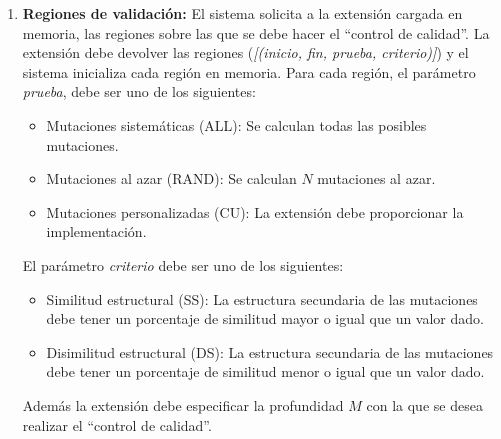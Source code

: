 \documentclass[10pt,a4paper]{article}
\begin{document}
\begin{enumerate}
    \item \textbf{Regiones de validaci\'on:}
    El sistema solicita a la extensi\'on cargada en memoria, las regiones sobre
las que se debe hacer el ``control de calidad''. La extensi\'on debe devolver
las regiones (\textit{[(inicio, fin, prueba, criterio)]}) y el sistema
inicializa cada regi\'on en memoria. Para cada regi\'on, el par\'ametro
\textit{prueba}, debe ser uno de los siguientes:
      \begin{itemize}
        \item Mutaciones sistem\'aticas (ALL): Se calculan todas las posibles
mutaciones.
	\item Mutaciones al azar (RAND): Se calculan $N$ mutaciones al azar.
	\item Mutaciones personalizadas (CU): La extensi\'on debe proporcionar
la implementaci\'on.
      \end{itemize}    
    El par\'ametro \textit{criterio} debe ser uno de los siguientes:
      \begin{itemize}
        \item Similitud estructural (SS): La estructura secundaria de las
mutaciones debe tener un porcentaje de similitud mayor o igual que un valor
dado.
	\item Disimilitud estructural (DS): La estructura secundaria de las
mutaciones debe tener un porcentaje de similitud menor o igual que un valor
dado.
      \end{itemize}
    
    Adem\'as la extensi\'on debe especificar la profundidad $M$ con la que se
desea realizar el ``control de calidad''.    
  \end{enumerate}
\end{document}
